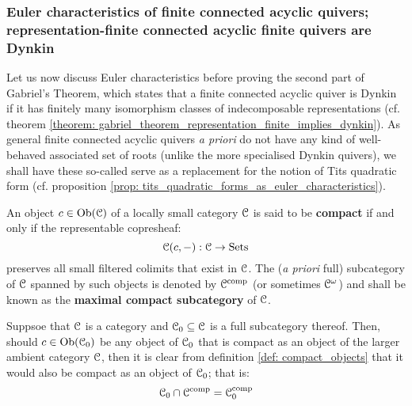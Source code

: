         \subsubsection{Euler characteristics of finite connected acyclic quivers; representation-finite connected acyclic finite quivers are Dynkin}
            Let us now discuss Euler characteristics before proving the second part of Gabriel's Theorem, which states that a finite connected acyclic quiver is Dynkin if it has finitely many isomorphism classes of indecomposable representations (cf. theorem \ref{theorem: gabriel_theorem_representation_finite_implies_dynkin}). As general finite connected acyclic quivers \textit{a priori} do not have any kind of well-behaved associated set of roots (unlike the more specialised Dynkin quivers), we shall have these so-called  serve as a replacement for the notion of Tits quadratic form (cf. proposition \ref{prop: tits_quadratic_forms_as_euler_characteristics}).
            \begin{definition} \label{def: compact_objects}
                An object $c \in \mathrm{Ob}(\mathcal{C})$ of a locally small category $\mathcal{C}$ is said to be \textbf{compact} if and only if the representable copresheaf:
                    $$\mathcal{C}(c, -): \mathcal{C} \to \mathrm{Sets}$$
                preserves all small filtered colimits that exist in $\mathcal{C}$. The (\textit{a priori} full) subcategory of $\mathcal{C}$ spanned by such objects is denoted by $\mathcal{C}^{\mathrm{comp}}$ (or sometimes $\mathcal{C}^{\omega}$) and shall be known as the \textbf{maximal compact subcategory} of $\mathcal{C}$. 
            \end{definition}
            \begin{remark} \label{remark: compact_objects_in_full_subcategories}
                Suppsoe that $\mathcal{C}$ is a category and $\mathcal{C}_0 \subseteq \mathcal{C}$ is a full subcategory thereof. Then, should $c \in \mathrm{Ob}(\mathcal{C}_0)$ be any object of $\mathcal{C}_0$ that is compact as an object of the larger ambient category $\mathcal{C}$, then it is clear from definition \ref{def: compact_objects} that it would also be compact as an object of $\mathcal{C}_0$; that is:
                    $$\mathcal{C}_0 \cap \mathcal{C}^{\mathrm{comp}} = \mathcal{C}_0^{\mathrm{comp}}$$
            \end{remark}
            \begin{example} \label{example: finitely_generated_modules_are_compact}
                
            \end{example}
